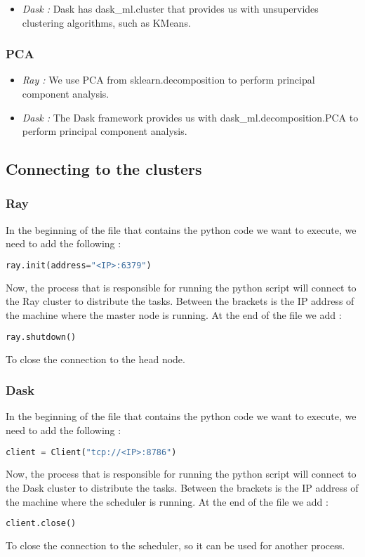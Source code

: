 \documentclass[conference]{IEEEtran}
\begin{document}
\begin{itemize}
    \item \textit{Dask :} Dask has dask\_ml.cluster that provides us with unsupervides clustering algorithms, such as KMeans.
\end{itemize}

\subsubsection{PCA}
\begin{itemize}
    \item \textit{Ray :} We use PCA from sklearn.decomposition to perform principal component analysis.
\end{itemize}

\begin{itemize}
    \item \textit{Dask :} The Dask framework provides us with dask\_ml.decomposition.PCA to perform principal component analysis.
\end{itemize}

\subsection{Connecting to the clusters}
\subsubsection{Ray}
In the beginning of the file that contains the python code we want to execute, we need to add the following :
\begin{lstlisting}[language=python]
ray.init(address="<IP>:6379")
\end{lstlisting}
Now, the process that is responsible for running the python script will connect to the Ray cluster to distribute the tasks. Between the brackets is the IP address of the machine where the master node is running. At the end of the file we add :
\begin{lstlisting}[language=python]
ray.shutdown()
\end{lstlisting}
To close the connection to the head node.
\subsubsection{Dask}
In the beginning of the file that contains the python code we want to execute, we need to add the following :
\begin{lstlisting}[language=python]
client = Client("tcp://<IP>:8786")
\end{lstlisting}
Now, the process that is responsible for running the python script will connect to the Dask cluster to distribute the tasks. Between the brackets is the IP address of the machine where the scheduler is running. At the end of the file we add :
\begin{lstlisting}[language=python]
client.close()
\end{lstlisting}
To close the connection to the scheduler, so it can be used for another process.
\FloatBarrier
\end{document}
